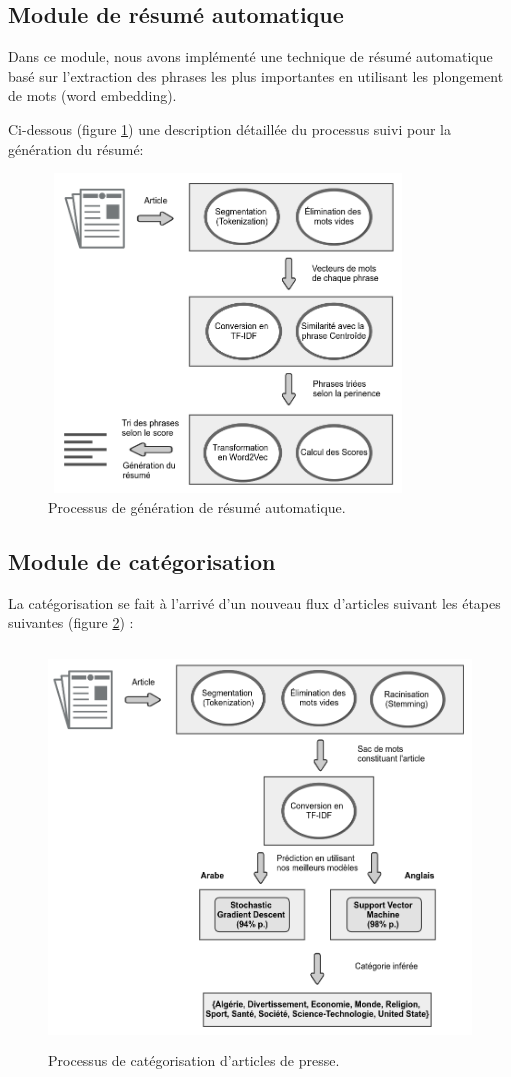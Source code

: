 \subsection{Module de résumé automatique}
Dans ce module, nous avons implémenté une technique de résumé automatique basé sur l'extraction des phrases les plus importantes en utilisant les plongement de mots (word embedding).

Ci-dessous (figure \ref{summaryglobal}) une description détaillée du processus suivi pour la génération du résumé:
\begin{figure}[H]
    \centering
    \includegraphics[height=240pt,width=270pt]{img/chapter3/summary.png}
    \caption{Processus de génération de résumé automatique.}
    \label{summaryglobal}
\end{figure}


\subsection{Module de catégorisation}
La catégorisation se fait à l'arrivé d'un nouveau flux d'articles suivant les étapes suivantes (figure \ref{categglobal}) :

\begin{figure}[H]
    \centering
    \includegraphics[height=300pt,width=350pt]{img/chapter3/categorization.png}
    \caption{Processus de catégorisation d'articles de presse.}
    \label{categglobal}
\end{figure}

